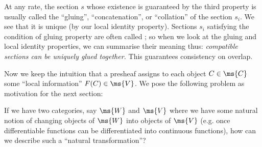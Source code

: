 At any rate, the section $s$ whose existence is guaranteed by the
third property is usually called the ``gluing'',
``concatenation'', or ``collation'' of the section $s_{i}$. We
see that it is unique (by our local identity property). Sections
$s_{i}$ satisfying the condition of gluing property are often called
; so when we look at the gluing and local
identity properties, we can summarise their meaning thus:
\emph{compatible sections can be uniquely glued together.} This
guarantees consistency on overlap.

Now we keep the intuition that a presheaf assigns to each object
$C\in\ms{C}$ some ``local information'' $F(C)\in\ms{V}$. We pose
the following problem as motivation for the next section:
\begin{prob}
If we have two categories, say $\ms{W}$ and $\ms{V}$ where we
have some natural notion of changing objects of $\ms{W}$ into
objects of $\ms{V}$ (e.g. once differentiable functions can be
differentiated into continuous functions), how can we describe
such a ``natural transformation''?
\end{prob}
